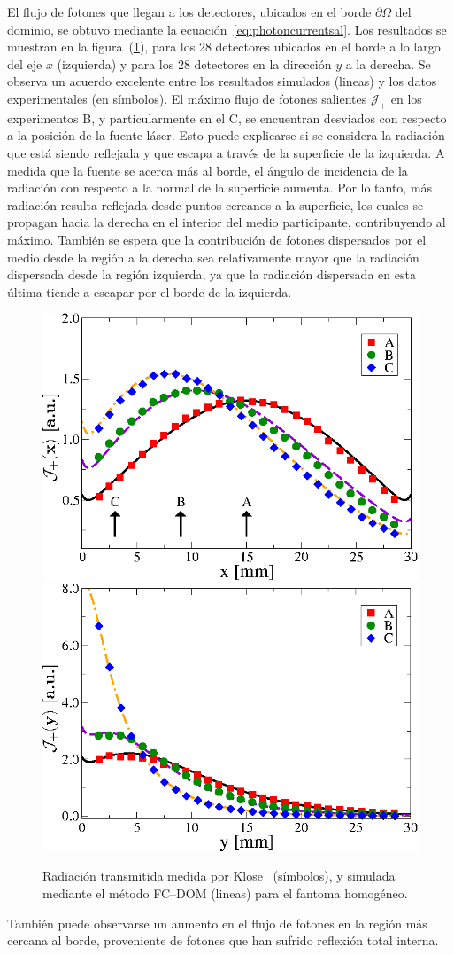 El flujo de fotones que llegan a los detectores, ubicados en el borde $\partial \Omega$ 
del dominio, se obtuvo mediante la ecuación~\eqref{eq:photoncurrentsal}. 
Los resultados se muestran en la figura~(\ref{fig:fluxph1}), 
para los 28 detectores ubicados en el borde a lo largo del eje $x$ (izquierda) 
y para los 28 detectores en la dirección $y$ a la derecha. 
Se observa un acuerdo excelente entre los resultados simulados (lineas) 
y los datos experimentales (en símbolos).  El máximo 
flujo de fotones salientes $\mathcal{J}_+$ en los experimentos B, 
y particularmente en el C, se encuentran desviados con respecto a la posición 
de la fuente láser. Esto puede explicarse si se considera la radiación 
que está siendo reflejada y que escapa a través de la superficie de la izquierda. 
A medida que la fuente se acerca más al borde, el ángulo de incidencia de la 
radiación con respecto a la normal de la superficie aumenta. Por lo tanto, 
más radiación resulta reflejada desde puntos cercanos a la superficie, 
los cuales se propagan hacia la derecha en el interior del medio participante, 
contribuyendo al máximo. También se espera que la contribución de fotones dispersados 
por el medio desde la región a la derecha sea relativamente mayor 
que la radiación dispersada desde la región izquierda, ya que la radiación 
dispersada en esta última tiende a escapar por el borde de la izquierda. 
\begin{figure}[h!]
\centering
  \includegraphics[width=0.48\linewidth]{figuras/kloseph1x.eps}
  \includegraphics[width=0.48\linewidth]{figuras/ph1y.eps}
  \caption{Radiación transmitida medida por Klose~\cite{Klose2002} (símbolos), 
  y simulada mediante el método FC--DOM (lineas) para el fantoma homogéneo. }
 \label{fig:fluxph1}
\end{figure}
También puede observarse un aumento en el flujo de fotones en la región más 
cercana al borde, proveniente de fotones que han sufrido reflexión total interna.

